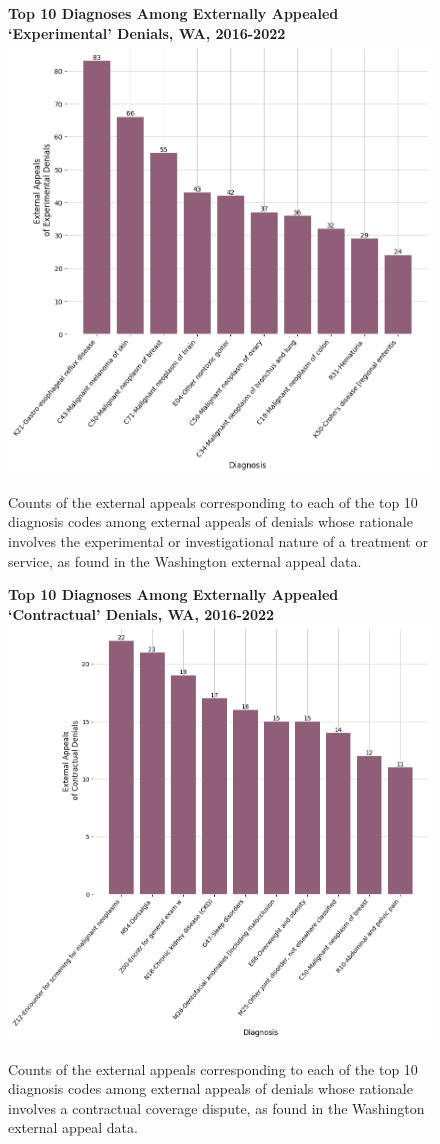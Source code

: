 \documentclass[12pt, a4paper,twoside]{report}
\theoremstyle{plain} %
\theoremstyle{definition} %
\theoremstyle{remark} %
\numberwithin{equation}{chapter}
\begin{document}
		\begin{figure}[h!]
			\centering
			\textbf{Top 10 Diagnoses Among Externally Appealed `Experimental' Denials, WA, 2016-2022}
			\includegraphics[width=.8\textwidth]{images/wa_external_appeals/top_experimental_appeal_diagnoses.png}
			\caption{Counts of the external appeals corresponding to each of the top 10 diagnosis codes among external appeals of denials whose rationale involves the experimental or investigational nature of a treatment or service, as found in the Washington external appeal data.}
			\label{waexpexternalappealsbydiagnosis}
		\end{figure}
	
		\begin{figure}[h!]
			\centering
			\textbf{Top 10 Diagnoses Among Externally Appealed `Contractual' Denials, WA, 2016-2022}
			\includegraphics[width=.8\textwidth]{images/wa_external_appeals/top_contractual_appeal_diagnoses.png}
			\caption{Counts of the external appeals corresponding to each of the top 10 diagnosis codes among external appeals of denials whose rationale involves a contractual coverage dispute, as found in the Washington external appeal data.}
			\label{wacontractualexternalappealsbydiagnosis}
		\end{figure}
	
\end{document}
